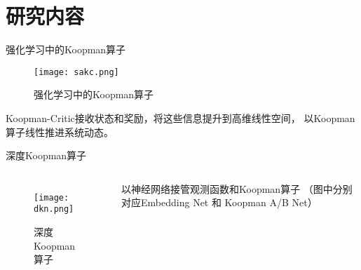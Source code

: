 \documentclass{ldr-simple-gray}
\begin{document}
\section{研究内容}

%     

\begin{frame}{强化学习中的Koopman算子}
  \begin{figure}
    \texttt{[image: sakc.png]}
    \caption{强化学习中的Koopman算子}
  \end{figure}
  Koopman-Critic接收状态和奖励，将这些信息提升到高维线性空间，
  以Koopman算子线性推进系统动态。
\end{frame}

\begin{frame}{深度Koopman算子}
  \begin{columns}
    \begin{figure}
      \texttt{[image: dkn.png]}
      \caption{深度Koopman算子}
    \end{figure}
    以神经网络接管观测函数和Koopman算子
    （图中分别对应Embedding Net 和 Koopman A/B Net）
  \end{columns}
\end{frame}
\end{document}
